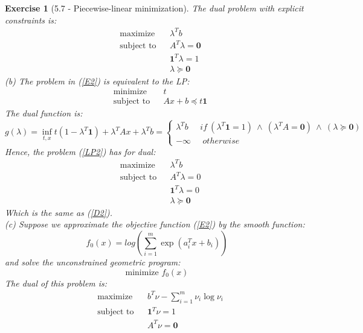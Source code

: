\documentclass[11pt]{article}
\theoremstyle{exo}
\newtheorem*{exercise}{Exercise}
\newcommand{\1}{\mathbf{1}}
\newcommand{\0}{\mathbf{0}}
\begin{document}
\begin{exercise}[5.7 - Piecewise-linear minimization]
The dual problem with explicit constraints is:
\begin{equation}
\label{D2}
\begin{aligned}
& {\text{maximize}} & & \lambda^Tb \\
& \text{subject to} & & A^T\lambda=\0\\
& & & \1^T\lambda=1\\
& & & \lambda\succeq \0
\end{aligned}
\end{equation}
(b) The problem in (\ref{E2}) is equivalent to the LP:
\begin{equation}
\label{LP2}
\begin{aligned}
& {\text{minimize}} & & t \\
& \text{subject to} & & Ax+b\preceq t\1
\end{aligned}
\end{equation}
The dual function is:
\[g(\lambda)=\inf_{t,x} t(1-\lambda^T\1)+\lambda^TAx+\lambda^Tb=\begin{cases}
\lambda^Tb\phantom{abc}if\:(\lambda^T\1=1)\:\wedge\:(\lambda^TA=\0)\:\wedge\:(\lambda\succeq\0)\\
-\infty\phantom{abc}otherwise
\end{cases}\]
Hence, the problem (\ref{LP2}) has for dual:
\begin{equation*}
\begin{aligned}
& {\text{maximize}} & & \lambda^Tb \\
& \text{subject to} & & A^T\lambda=0\\
&  & & \1^T\lambda=0\\
&  & & \lambda\succeq\0
\end{aligned}
\end{equation*}
Which is the same as (\ref{D2}).\\
(c) Suppose we approximate the objective function (\ref{E2}) by the smooth function:
\[f_0(x)=log\left(\sum\limits_{i=1}^m\exp(a_i^Tx+b_i)\right)\]
and solve the unconstrained geometric program:
\begin{equation}
\label{E3}
\text{minimize  } f_0(x)
\end{equation}
The dual of this problem is:
\begin{equation}
\label{D4}
\begin{aligned}
& {\text{maximize}} & & b^T\nu-\sum_{i=1}^m\nu_i\log\nu_i  \\
& \text{subject to} & & \1^T\nu=1\\
&  & & A^T\nu=\0\\

\end{aligned}
\end{equation}
\end{exercise}
\end{document}
